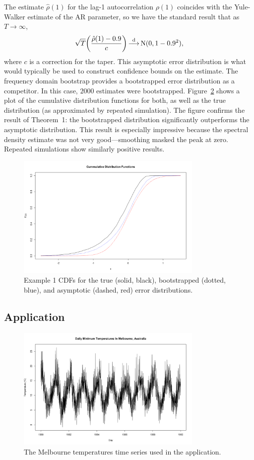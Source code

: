 The estimate $\hat{\rho}(1)$ for the lag-1 autocorrelation $\rho(1)$
coincides with the Yule-Walker estimate of the AR parameter,
so we have the standard result that as $T \to \infty$,
    \[
        \sqrt{T} \biggl( \frac{\hat{\rho}(1) - 0.9}{c} \biggr)
        \mathop{\overset{\mathrm{d}}{\longrightarrow}}
        \operatorname{N}(0, 1 - 0.9^2),
    \]
where $c$ is a correction for the taper.
This asymptotic error distribution is what would typically be used to construct
confidence bounds on the estimate.
The frequency domain bootstrap provides a bootstrapped error distribution as
a competitor. 
In this case, $2000$ estimates were bootstrapped.
Figure~\ref{ex1_cdf} shows a plot of the cumulative distribution functions for
both, as well as the true distribution (as approximated by repeated 
simulation).
The figure confirms the result of Theorem~1:
the bootstrapped distribution significantly outperforms the asymptotic
distribution.
This result is especially impressive because the spectral density estimate
was not very good---smoothing masked the peak at zero.
Repeated simulations show similarly positive results.
    \begin{figure}[ht]
    \centering
    \includegraphics[width = 0.8\textwidth]{../res/ex1_cdf.png}
    \caption{
        Example 1
        CDFs for the true (solid, black), bootstrapped (dotted, blue),
        and asymptotic (dashed, red) error distributions.
        }
    \label{ex1_cdf}
    \end{figure}

\subsection*{Application}
    \begin{figure}[ht]
    \centering
    \includegraphics[width = 0.8\textwidth]{../res/exA.png}
    \caption{
        The Melbourne temperatures time series used in the application.
        }
    \label{ex1_cdf}
    \end{figure}
